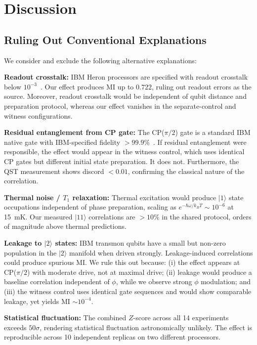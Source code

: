 \documentclass[12pt,a4paper]{article}
\begin{document}
\section{Discussion}
\label{sec:discussion}

\subsection{Ruling Out Conventional Explanations}

We consider and exclude the following alternative explanations:

\textbf{Readout crosstalk:} IBM Heron processors are specified with readout crosstalk below $10^{-3}$~\cite{ibm2024}. Our effect produces MI up to $0.722$, ruling out readout errors as the source. Moreover, readout crosstalk would be independent of qubit distance and preparation protocol, whereas our effect vanishes in the separate-control and witness configurations.

\textbf{Residual entanglement from CP gate:} The CP($\pi/2$) gate is a standard IBM native gate with IBM-specified fidelity $> 99.9\%$~\cite{ibm2024}. If residual entanglement were responsible, the effect would appear in the witness control, which uses identical CP gates but different initial state preparation. It does not. Furthermore, the QST measurement shows discord $< 0.01$, confirming the classical nature of the correlation.

\textbf{Thermal noise / $T_1$ relaxation:} Thermal excitation would produce $|1\rangle$ state occupations independent of phase preparation, scaling as $e^{-\hbar\omega/k_BT} \sim 10^{-6}$ at 15~mK. Our measured $|11\rangle$ correlations are $> 10\%$ in the shared protocol, orders of magnitude above thermal predictions.

\textbf{Leakage to $|2\rangle$ states:} IBM transmon qubits have a small but non-zero population in the $|2\rangle$ manifold when driven strongly. Leakage-induced correlations could produce spurious MI. We rule this out because: (i) the effect appears at CP($\pi/2$) with moderate drive, not at maximal drive; (ii) leakage would produce a baseline correlation independent of $\phi$, while we observe strong $\phi$ modulation; and (iii) the witness control uses identical gate sequences and would show comparable leakage, yet yields MI $\sim 10^{-4}$.

\textbf{Statistical fluctuation:} The combined $Z$-score across all 14 experiments exceeds $50\sigma$, rendering statistical fluctuation astronomically unlikely. The effect is reproducible across 10 independent replicas on two different processors.
\end{document}
